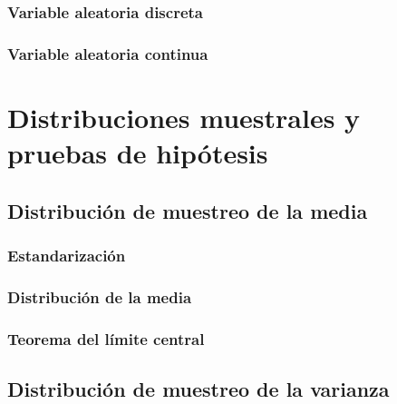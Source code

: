 \documentclass[
]{book}
\begin{document}
\hypertarget{variable-aleatoria-discreta-2}{%
\subsection{Variable aleatoria discreta}\label{variable-aleatoria-discreta-2}}

\hypertarget{variable-aleatoria-continua-2}{%
\subsection{Variable aleatoria continua}\label{variable-aleatoria-continua-2}}

\hypertarget{distribuciones-muestrales-y-pruebas-de-hipuxf3tesis}{%
\chapter{Distribuciones muestrales y pruebas de hipótesis}\label{distribuciones-muestrales-y-pruebas-de-hipuxf3tesis}}

\hypertarget{distribuciuxf3n-de-muestreo-de-la-media}{%
\section{Distribución de muestreo de la media}\label{distribuciuxf3n-de-muestreo-de-la-media}}

\hypertarget{estandarizaciuxf3n}{%
\subsection{Estandarización}\label{estandarizaciuxf3n}}

\hypertarget{distribuciuxf3n-de-la-media}{%
\subsection{Distribución de la media}\label{distribuciuxf3n-de-la-media}}

\hypertarget{teorema-del-luxedmite-central}{%
\subsection{Teorema del límite central}\label{teorema-del-luxedmite-central}}

\hypertarget{distribuciuxf3n-de-muestreo-de-la-varianza}{%
\section{Distribución de muestreo de la varianza}\label{distribuciuxf3n-de-muestreo-de-la-varianza}}
\end{document}
